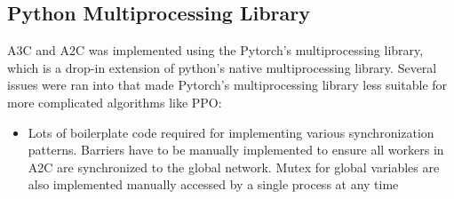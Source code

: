 \documentclass[11pt]{article} %
\begin{document}
\subsection{Python Multiprocessing Library}
A3C and A2C was implemented using the Pytorch's multiprocessing library, which is a drop-in extension of python's native multiprocessing library. Several issues were ran into that made Pytorch's multiprocessing library less suitable for more complicated algorithms like PPO:
\begin{itemize}
    \item Lots of boilerplate code required for implementing various synchronization patterns. Barriers have to be manually implemented to ensure all workers in A2C are synchronized to the global network. Mutex for global variables are also implemented manually accessed by a single process at any time
\end{itemize}
\newpage


\end{document}
